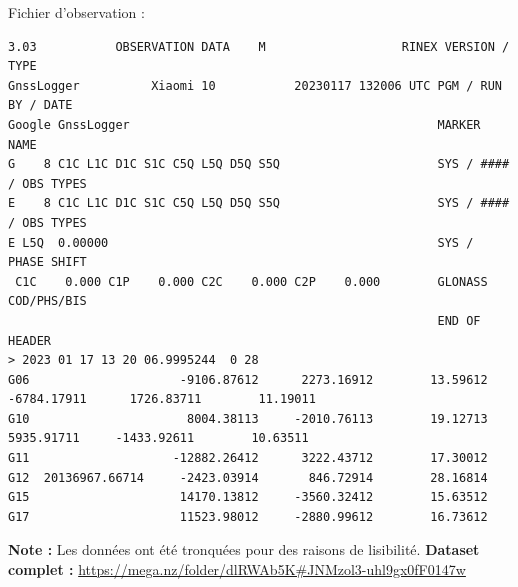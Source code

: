 \documentclass[xcolor=dvipsnames,envcountsect]{beamer}
\begin{document}
\begin{frame}[fragile]
	Fichier d'observation :
	\begin{lstlisting}[basicstyle=\tiny]
3.03           OBSERVATION DATA    M                   RINEX VERSION / TYPE
GnssLogger          Xiaomi 10           20230117 132006 UTC PGM / RUN BY / DATE
Google GnssLogger                                           MARKER NAME
G    8 C1C L1C D1C S1C C5Q L5Q D5Q S5Q                      SYS / #### / OBS TYPES
E    8 C1C L1C D1C S1C C5Q L5Q D5Q S5Q                      SYS / #### / OBS TYPES
E L5Q  0.00000                                              SYS / PHASE SHIFT
 C1C    0.000 C1P    0.000 C2C    0.000 C2P    0.000        GLONASS COD/PHS/BIS
															END OF HEADER
> 2023 01 17 13 20 06.9995244  0 28                      
G06                     -9106.87612      2273.16912        13.59612                     -6784.17911      1726.83711        11.19011
G10                      8004.38113     -2010.76113        19.12713                      5935.91711     -1433.92611        10.63511
G11                    -12882.26412      3222.43712        17.30012                                                                
G12  20136967.66714     -2423.03914       846.72914        28.16814                                                                
G15                     14170.13812     -3560.32412        15.63512                                                                
G17                     11523.98012     -2880.99612        16.73612                                                                
	\end{lstlisting}
	\textbf{Note :} Les données ont été tronquées pour des raisons de lisibilité.
	\textbf{Dataset complet : } \url{https://mega.nz/folder/dlRWAb5K#JNMzol3-uhl9gx0fF0147w}
\end{frame}
\end{document}
